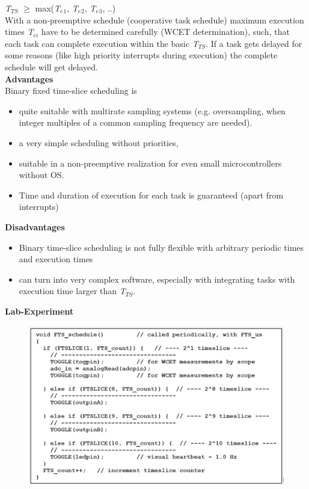 \textit{   T${}_{TS}$} $\mathrm{\ge}$ max(\textit{T${}_{e}$}${}_{1}$,\textit{ T${}_{e}$}${}_{2}$,\textit{ T${}_{e}$}${}_{3}$, ..)\\

With a non-preemptive schedule (cooperative task schedule) maximum execution times \textit{T${}_{ei}$} have to be determined carefully (WCET determination), such, that each task can complete execution within the basic \textit{T${}_{TS}$}. If a task gets delayed for some reasons (like high priority interrupts during execution) the complete schedule will get delayed.\\

\textbf{Advantages }\\

Binary fixed time-slice scheduling is

\begin{itemize}
	\item  quite suitable with multirate sampling systems (e.g. oversampling, when integer multiples of a common sampling frequency are needed).
	\item  a very simple scheduling without priorities,
	\item  suitable in a non-preemptive realization for even small microcontrollers without OS. 
	\item  Time and duration of execution for each task is guaranteed (apart from interrupts)
\end{itemize}

\textbf{Disadvantages }

\begin{itemize}
	\item \textbf{ }Binary time-slice scheduling is not fully flexible with arbitrary periodic times and execution times
	\item  can turn into very complex software, especially with integrating tasks with execution time larger than \textit{T${}_{TS}$}.
\end{itemize}

\textbf{Lab-Experiment}   \textbf{}

	\begin{figure}[h]
    \centering
    \includegraphics[width=13cm, height=7cm]{Images/image95.png}
    \label{fig:Fig 40}
    \end{figure}

